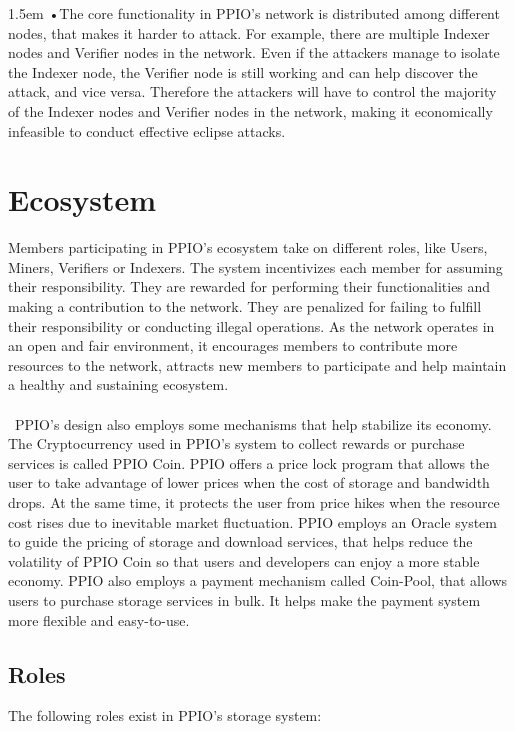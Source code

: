 \documentclass[10pt,a4paper]{article}
\begin{document}
\hangindent 1.5em
\noindent   
•\quad The core functionality in PPIO’s network is distributed among different nodes, that makes it harder to attack. For example, there are multiple Indexer nodes and Verifier nodes in the network. Even if the attackers manage to isolate the Indexer node, the Verifier node is still working and can help discover the attack, and vice versa. Therefore the attackers will have to control the majority of the Indexer nodes and Verifier nodes in the network, making it economically infeasible to conduct effective eclipse attacks.
   \vspace{-0.5em}


   \section{Ecosystem} %
Members participating in PPIO’s ecosystem take on different roles, like Users, Miners, Verifiers or Indexers.  The system incentivizes each member for assuming their responsibility. They are rewarded for performing their functionalities and making a contribution to the network. They are penalized for failing to fulfill their responsibility or conducting illegal operations. As the network operates in an open and fair environment, it encourages members to contribute more resources to the network, attracts new members to participate and help maintain a healthy and sustaining ecosystem.
   \vspace{-0.5em}
\\\\\ PPIO’s design also employs some mechanisms that help stabilize its economy. The Cryptocurrency used in PPIO’s system to collect rewards or purchase services is called PPIO Coin. PPIO offers a price lock program that allows the user to take advantage of lower prices when the cost of storage and bandwidth drops. At the same time, it protects the user from price hikes when the resource cost rises due to inevitable market fluctuation.  PPIO employs an Oracle system to guide the pricing of storage and download services, that helps reduce the volatility of PPIO Coin so that users and developers can enjoy a more stable economy. PPIO also employs a payment mechanism called Coin-Pool, that allows users to purchase storage services in bulk. It helps make the payment system more flexible and easy-to-use.
   \vspace{-0.5em}
   
      \subsection{Roles} %
The following roles exist in PPIO’s storage system:
   \vspace{-0.8em}
\\
\end{document}
